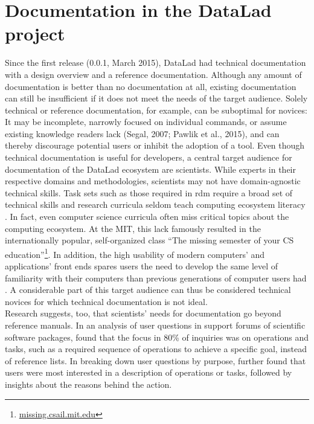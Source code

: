 

\section{Documentation in the DataLad project}

Since the first release (0.0.1, March 2015), DataLad had technical documentation with a design overview and a reference documentation.
Although any amount of documentation is better than no documentation at all, existing documentation can still be insufficient if it does not meet the needs of the target audience.
Solely technical or reference documentation, for example, can be suboptimal for novices: It may be incomplete, narrowly focused on individual commands, or assume existing knowledge readers lack (Segal, 2007; Pawlik et al., 2015), and can thereby discourage potential users or inhibit the adoption of a tool.
Even though technical documentation is useful for developers, a central target audience for documentation of the DataLad ecosystem are scientists.
While experts in their respective domains and methodologies, scientists may not have domain-agnostic technical skills.
Task sets such as those required in \gls{rdm} require a broad set of technical skills  and research curricula seldom teach computing ecosystem literacy \citep{grisham2016proposed}.
In fact, even computer science curricula often miss critical topics about the computing ecosystem.
At the \gls{MIT}, this lack famously resulted in the internationally popular, self-organized class ``The missing semester of your CS education''\footnote{\href{https://missing.csail.mit.edu/about/}{missing.csail.mit.edu}}.
In addition, the high usability of modern computers' and applications' front ends spares users the need to develop the same level of familiarity with their computers than previous generations of computer users had \citep{mehlenbacher2003documentation}.
A considerable part of this target audience can thus be considered technical novices for which technical documentation is not ideal. \\
Research suggests, too, that scientists' needs for documentation go beyond reference manuals.
In an analysis of user questions in support forums of scientific software packages, \citet{swarts2019open} found that the focus in 80\% of inquiries was on operations and tasks, such as a required sequence of operations to achieve a specific goal, instead of reference lists.
In breaking down user questions by purpose, \citet{swarts2019open} further found that users were most interested in a description of operations or tasks, followed by insights about the reasons behind the action.
